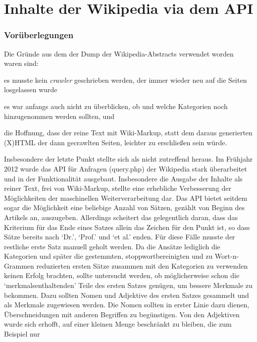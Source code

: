 \documentclass[pagesize,DIV=calc,12pt,draft]{scrreprt}
\begin{document}
\section{Inhalte der Wikipedia via dem API}

\subsubsection{Vorüberlegungen}

Die Gründe aus dem der Dump der Wikipedia-Abstracts verwendet worden waren sind: 
\begin{inparaenum}
\item es musste kein \emph{crawler} geschrieben werden, der immer wieder neu auf die Seiten losgelassen wurde
\item es war anfangs auch nicht zu überblicken, ob und welche Kategorien noch hinzugenommen werden sollten, und 
\item die Hoffnung, dass der reine Text mit Wiki-Markup, statt dem daraus generierten (X)HTML der dann gecrawlten Seiten, leichter zu erschließen sein würde.
\end{inparaenum}

Insbesondere der letzte Punkt stellte sich als nicht zutreffend heraus. 
Im Frühjahr 2012 wurde das API für Anfragen (query.php) der Wikipedia stark überarbeitet und in der Funktionalität ausgebaut. 
Insbesondere die Ausgabe der Inhalte als reiner Text, frei von Wiki-Markup, stellte eine erhebliche Verbesserung der Möglichkeiten der maschinellen Weiterverarbeitung dar. 
Das API bietet seitdem sogar die Möglichkeit eine beliebige Anzahl von Sätzen, gezählt von Beginn des Artikels an, auszugeben. 
Allerdings scheitert das gelegentlich daran, dass das Kriterium für das Ende eines Satzes allein das Zeichen für den Punkt ist, so dass Sätze bereits nach `Dr.', `Prof.' und `et al.' enden. 
Für diese Fälle musste der restliche erste Satz manuell geholt werden. 
Da die Ansätze lediglich die Kategorien und später die gestemmten, stoppwortbereinigten und zu Wort-n-Grammen reduzierten ersten Sätze zusammen mit den Kategorien zu verwenden keinen Erfolg brachten, sollte untersucht werden, ob möglicherweise schon die `merkmalsenthaltenden' Teile des ersten Satzes genügen, um bessere Merkmale zu bekommen. 
Dazu sollten Nomen und Adjektive des ersten Satzes gesammelt und als Merkmale zugewiesen werden. 
Die Nomen sollten in erster Linie dazu dienen, Überschneidungen mit anderen Begriffen zu begünstigen. 
Von den Adjektiven wurde sich erhofft, auf einer kleinen Menge beschränkt zu bleiben, die zum Beispiel nur 
\end{document}
